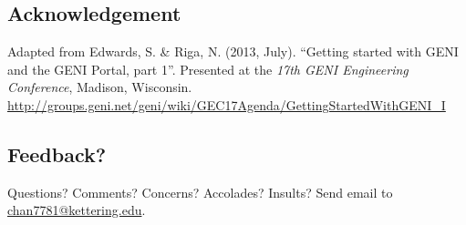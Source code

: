 \documentclass[12pt]{article}
\begin{document}
\subsection*{Acknowledgement}

Adapted from Edwards, S. \& Riga, N. (2013, July).
``Getting started with GENI and the GENI Portal, part 1''.
Presented at the \emph{17th GENI Engineering Conference}, Madison, Wisconsin.
\url{http://groups.geni.net/geni/wiki/GEC17Agenda/GettingStartedWithGENI_I}

\subsection*{Feedback?}
Questions? Comments? Concerns? Accolades? Insults? Send email to \url{chan7781@kettering.edu}.
\end{document}
